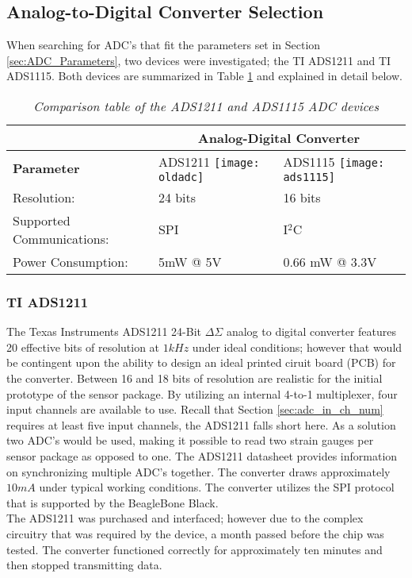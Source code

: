 \subsection{Analog-to-Digital Converter Selection}
\indent When searching for ADC's that fit the parameters set in Section \ref{sec:ADC_Parameters}, two devices were investigated; the TI ADS1211 and TI ADS1115. Both devices are summarized in Table \ref{tab:ADC_Compare} and explained in detail below.

\begin{table}[H]
	\begin{center}
		\begin{tabular}{|p{2.5cm}| p{3cm} | p{3cm} |}
		\hline
		&\multicolumn{2}{c|}{\textbf{Analog-Digital Converter}}\\
		\hline
		\textbf{Parameter} & ADS1211 
		\texttt{[image: oldadc]}
		& ADS1115
		\texttt{[image: ads1115]}\\
		\hline
		Resolution: & 24 bits & 16 bits\\
		\hline
		Supported Communications:&	 SPI&I$^2$C\\
		\hline
		Power Consumption:&	5mW @ 5V	& 0.66 mW @ 3.3V\\
		\hline

		\end{tabular}
		\caption{\textit{Comparison table of the ADS1211 and ADS1115 ADC devices}}
	\label{tab:ADC_Compare}
	\end{center}
\end{table}


\subsubsection{TI ADS1211}
\label{sec:ADC_ADS1211}
\indent The Texas Instruments ADS1211 24-Bit $\Delta \Sigma$ analog to digital converter features 20 effective bits of resolution at $1kHz$ under ideal conditions; however that would be contingent upon the ability to design an ideal printed ciruit board (PCB) for the converter. Between 16 and 18 bits of resolution are realistic for the initial prototype of the sensor package. By utilizing an internal 4-to-1 multiplexer, four input channels are available to use. Recall that Section \ref{sec:adc_in_ch_num} requires at least five input channels, the ADS1211 falls short here. As a solution two ADC's would be used, making it possible to read two strain gauges per sensor package as opposed to one. The ADS1211 datasheet provides information on synchronizing multiple ADC's together. The converter draws approximately $10mA$ under typical working conditions. The converter utilizes the SPI protocol that is supported by the BeagleBone Black.\\
\indent The ADS1211 was purchased and interfaced; however due to the complex circuitry that was required by the device, a month passed before the chip was tested. The converter functioned correctly for approximately ten minutes and then stopped transmitting data. 
